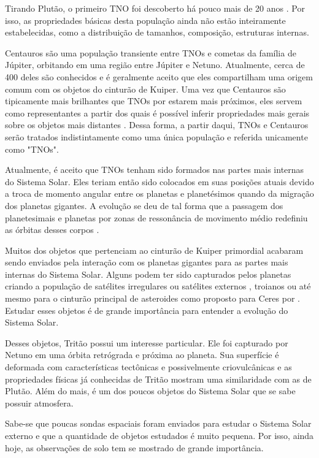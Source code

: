 \documentclass[12pt,a4paper]{monografia}
\begin{document}
Tirando Plutão, o primeiro TNO foi descoberto há pouco mais de 20 anos \citep{Jewitt1993}. Por isso, as propriedades básicas desta população ainda não estão inteiramente estabelecidas, como a distribuição de tamanhos, composição, estruturas internas.

Centauros são uma população transiente entre TNOs e cometas da família de Júpiter, orbitando em uma região entre Júpiter e Netuno. Atualmente, cerca de 400 deles são conhecidos e é geralmente aceito que eles compartilham uma origem comum com os objetos do cinturão de Kuiper. Uma vez que Centauros são tipicamente mais brilhantes que TNOs por estarem mais próximos, eles servem como representantes a partir dos quais é possível inferir propriedades mais gerais sobre os objetos mais distantes \citep{Fernandez2002}. Dessa forma, a partir daqui, TNOs e Centauros serão tratados indistintamente como uma única população e referida unicamente como "TNOs".

Atualmente, é aceito que TNOs tenham sido formados nas partes mais internas do Sistema Solar. Eles teriam então sido colocados em suas posições atuais devido a troca de momento angular entre os planetas e planetésimos quando da migração dos planetas gigantes. A evolução se deu de tal forma que a passagem dos planetesimais e planetas por zonas de ressonância de movimento médio redefiniu as órbitas desses corpos \citep{Tsiganis2005}.

Muitos dos objetos que pertenciam ao cinturão de Kuiper primordial acabaram sendo enviados pela interação com os planetas gigantes para as partes mais internas do Sistema Solar. Alguns podem ter sido capturados pelos planetas criando a população de satélites irregulares ou satélites externos \citep{Nesvorny2007}, troianos \citep{Morbidelli2005} ou até mesmo para o cinturão principal de asteroides como proposto para Ceres por \cite{McKinnon2012}. Estudar esses objetos é de grande importância para entender a evolução do Sistema Solar.

Desses objetos, Tritão possui um interesse particular. Ele foi capturado por Netuno \citep{McKinnon2007} em uma órbita retrógrada e próxima ao planeta. Sua superfície é deformada com características tectônicas e possivelmente criovulcânicas \citep{Nimmo2015} e as propriedades físicas já conhecidas de Tritão mostram uma similaridade com as de Plutão. Além do mais, é um dos poucos objetos do Sistema Solar que se sabe possuir atmosfera.

Sabe-se que poucas sondas espaciais foram enviados para estudar o Sistema Solar externo e que a quantidade de objetos estudados é muito pequena. Por isso, ainda hoje, as observações de solo tem se mostrado de grande importância.
\end{document}
